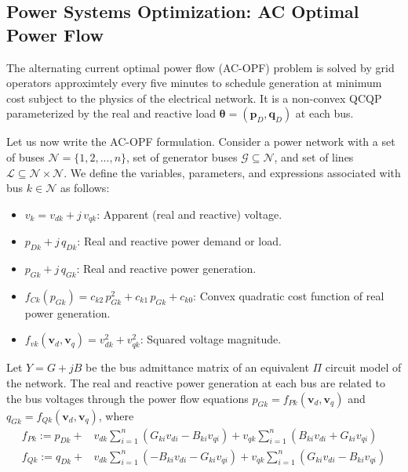 \documentclass[10pt]{article} %
\theoremstyle{plain}
\theoremstyle{definition}
\theoremstyle{remark}
\begin{document}
\subsection{Power Systems Optimization: AC Optimal Power Flow}

The alternating current optimal power flow (AC-OPF) problem is solved by grid operators approximtely every five minutes to schedule generation at minimum cost subject to the physics of the electrical network.
It is a non-convex QCQP parameterized by the real and reactive load $\bm{\theta} = (\mathbf{p}_D, \mathbf{q}_D)$ at each bus.

Let us now write the AC-OPF formulation. Consider a power network with a set of buses $\mathcal{N} = \{1, 2, ..., n\}$, set of generator buses $\mathcal{G} \subseteq \mathcal{N}$, and set of lines $\mathcal{L} \subseteq \mathcal{N} \times \mathcal{N}$. We define the variables, parameters, and expressions associated with bus $k \in \mathcal{N}$ as follows:
\begin{itemize}[itemsep=2pt, topsep=0pt, parsep=0pt, partopsep=0pt]
    \item $v_k = v_{dk} + j\, v_{qk}$: Apparent (real and reactive) voltage.
    \item $p_{Dk} + j\, q_{Dk}$: Real and reactive power demand or load.
    \item $p_{Gk} + j\, q_{Gk}$: Real and reactive power generation.
    \item $f_{Ck}(p_{Gk}) = c_{k2}\, p_{Gk}^2 + c_{k1} \, p_{Gk} + c_{k0}$: Convex quadratic cost function of real power generation.
    \item $f_{vk}(\mathbf{v}_d, \mathbf{v}_q) = v_{dk}^2 + v_{qk}^2$: Squared voltage magnitude.
\end{itemize}

Let $Y = G + j B$ be the bus admittance matrix of an equivalent $\Pi$ circuit model of the network.
The real and reactive power generation at each bus are related to the bus voltages through the power flow equations $p_{Gk} = f_{Pk}(\mathbf{v}_d, \mathbf{v}_q)$ and $q_{Gk} = f_{Qk}(\mathbf{v}_d, \mathbf{v}_q)$, where
{
\setlength{\abovedisplayskip}{1pt}
\setlength{\belowdisplayskip}{3pt}
\setlength{\jot}{0pt}
\setlength{\arraycolsep}{3pt}
\begin{align}
    f_{Pk} :=  p_{Dk} + &v_{dk} \sum_{i=1}^{n}(G_{ki} v_{di} - B_{ki} v_{qi})
    + v_{qk} \sum_{i=1}^n (B_{ki} v_{di} + G_{ki} v_{qi}) \label{eq:active-power-flow}\\
    f_{Qk} := q_{Dk} + &v_{dk}\sum_{i=1}^{n}(-B_{ki} v_{di} - G_{ki} v_{qi})
    + v_{qk} \sum_{i=1}^n (G_{ki} v_{di} - B_{ki} v_{qi}) \label{eq:reactive-power-flow}
\end{align}
}
\end{document}
